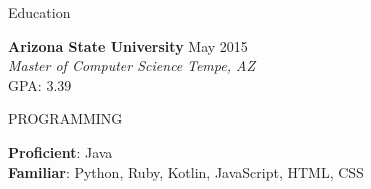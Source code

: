 \documentclass{resume} %
\begin{document}

\begin{rSection}{Education}

{\bf Arizona State University} \hfill {May 2015} \\ 
{\em Master of Computer Science} \hfill {\em Tempe, AZ} \\
GPA: 3.39

\end{rSection}


\begin{rSection}{PROGRAMMING}
	
\textbf{Proficient}: Java \\
\textbf{Familiar}: Python, Ruby, Kotlin, JavaScript, HTML, CSS       \\
	
\end{rSection}












\end{document}
